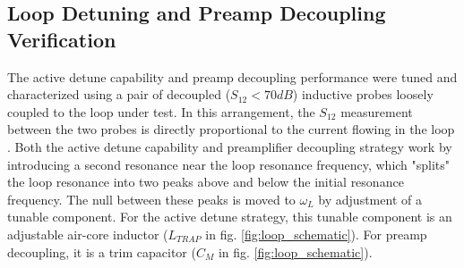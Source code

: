 \subsection{Loop Detuning and Preamp Decoupling Verification}
The active detune capability and preamp decoupling performance were  tuned and characterized using a pair of decoupled
($S_{12}<70dB$) inductive probes loosely coupled to the loop under test. In this arrangement, the $S_{12}$ measurement
between the two probes is directly proportional to the current flowing in the loop \cite{Reykowski1995}. Both the active
detune capability and preamplifier decoupling strategy work by introducing a second resonance near the loop resonance
frequency, which "splits" the loop resonance into two peaks above and below the initial resonance frequency. The null
between these peaks is moved to $\omega_L$ by adjustment of a tunable component. For the active detune strategy, this
tunable component is an adjustable air-core inductor ($L_{TRAP}$ in fig. \ref{fig:loop_schematic}). For preamp
decoupling, it is a trim capacitor ($C_M$ in fig.  \ref{fig:loop_schematic}).
